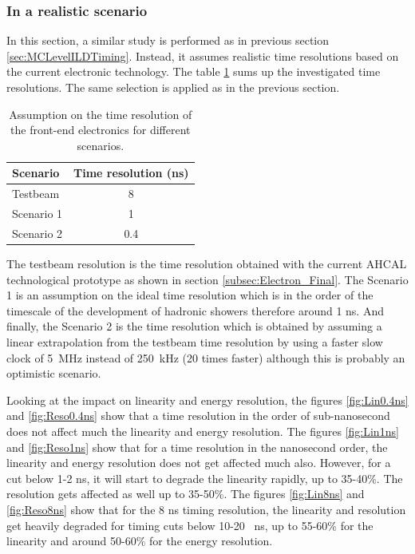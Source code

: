 \subsubsection{In a realistic scenario}
\label{sec:RealisticScenario}

In this section, a similar study is performed as in previous section \ref{sec:MCLevelILDTiming}. Instead, it assumes realistic time resolutions based on the current electronic technology. The table \ref{table:TimeReso} sums up the investigated time resolutions. The same selection is applied as in the previous section.

\begin{table}[htb!]
  \centering
  \caption{Assumption on the time resolution of the front-end electronics for different scenarios.} \label{table:TimeReso}
  \begin{tabular}{@{} lc @{}}
    \toprule
    Scenario & Time resolution (ns) \\
    \midrule
    Testbeam & 8 \\
    Scenario 1 & 1 \\
    Scenario 2 & 0.4 \\
    \bottomrule
  \end{tabular}
\end{table}

The testbeam resolution is the time resolution obtained with the current AHCAL technological prototype as shown in section \ref{subsec:Electron_Final}. The Scenario 1 is an assumption on the ideal time resolution which is in the order of the timescale of the development of hadronic showers therefore around 1 ns. And finally, the Scenario 2 is the time resolution which is obtained by assuming a linear extrapolation from the testbeam time resolution by using a faster slow clock of \SI{5}{\mega\hertz} instead of \SI{250}{\kilo\hertz} (20 times faster) although this is probably an optimistic scenario.

Looking at the impact on linearity and energy resolution, the figures \ref{fig:Lin0.4ns} and \ref{fig:Reso0.4ns} show that a time resolution in the order of sub-nanosecond does not affect much the linearity and energy resolution. The figures \ref{fig:Lin1ns} and \ref{fig:Reso1ns} show that for a time resolution in the nanosecond order, the linearity and energy resolution does not get affected much also. However, for a cut below 1-2 ns, it will start to degrade the linearity rapidly, up to 35-40\%. The resolution gets affected as well up to 35-50\%. The figures \ref{fig:Lin8ns} and \ref{fig:Reso8ns} show that for the 8 ns timing resolution, the linearity and resolution get heavily degraded for timing cuts below 10-20 \SI{}{\nano\second}, up to 55-60\% for the linearity and around 50-60\% for the energy resolution.

